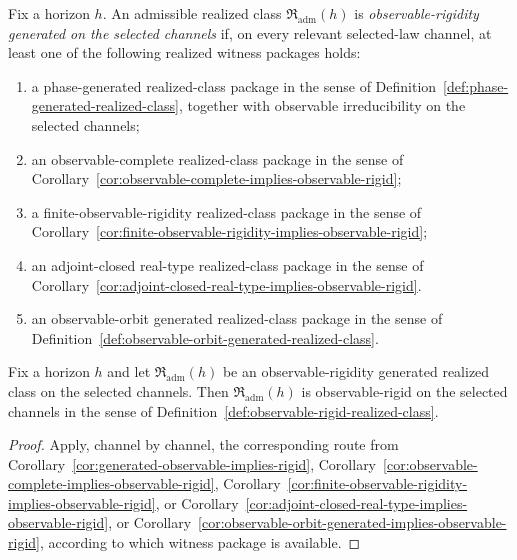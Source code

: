 \begin{definition}
\label{def:observable-rigidity-generated-realized-class}
Fix a horizon $h$. An admissible realized class
$\mathfrak R_{\mathrm{adm}}(h)$ is \emph{observable-rigidity generated on the
selected channels} if, on every relevant selected-law channel, at least one of
the following realized witness packages holds:
\begin{enumerate}[label=(\roman*), leftmargin=2em, itemsep=0.2em]
\item a phase-generated realized-class package in the sense of
      Definition~\ref{def:phase-generated-realized-class}, together with
      observable irreducibility on the selected channels;
\item an observable-complete realized-class package in the sense of
      Corollary~\ref{cor:observable-complete-implies-observable-rigid};
\item a finite-observable-rigidity realized-class package in the sense of
      Corollary~\ref{cor:finite-observable-rigidity-implies-observable-rigid};
\item an adjoint-closed real-type realized-class package in the sense of
      Corollary~\ref{cor:adjoint-closed-real-type-implies-observable-rigid}.
\item an observable-orbit generated realized-class package in the sense of
      Definition~\ref{def:observable-orbit-generated-realized-class}.
\end{enumerate}
\end{definition}

\begin{corollary}
\label{cor:observable-rigidity-generated-implies-rigid}
Fix a horizon $h$ and let $\mathfrak R_{\mathrm{adm}}(h)$ be an
observable-rigidity generated realized class on the selected channels. Then
$\mathfrak R_{\mathrm{adm}}(h)$ is observable-rigid on the selected channels in
the sense of Definition~\ref{def:observable-rigid-realized-class}.
\end{corollary}

\begin{proof}
Apply, channel by channel, the corresponding route from
Corollary~\ref{cor:generated-observable-implies-rigid},
Corollary~\ref{cor:observable-complete-implies-observable-rigid},
Corollary~\ref{cor:finite-observable-rigidity-implies-observable-rigid}, or
Corollary~\ref{cor:adjoint-closed-real-type-implies-observable-rigid}, or
Corollary~\ref{cor:observable-orbit-generated-implies-observable-rigid},
according to which witness package is available.
\end{proof}

